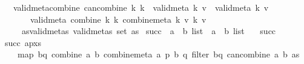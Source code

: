 \begin{isabellebody}
\ \ \ valid{\isacharunderscore}{\kern0pt}meta{\isacharunderscore}{\kern0pt}combine{\isacharcolon}{\kern0pt}\ {\isachardoublequoteopen}can{\isacharunderscore}{\kern0pt}combine\ k{}\ k{}\ {\isasymLongrightarrow}\ valid{\isacharunderscore}{\kern0pt}meta\ k{}\ v{}\ {\isasymLongrightarrow}\ valid{\isacharunderscore}{\kern0pt}meta\ k{}\ v{}\isanewline
\ \ \ \ \ \ {\isasymLongrightarrow}\ valid{\isacharunderscore}{\kern0pt}meta\ {\isacharparenleft}{\kern0pt}combine\ k{}\ k{}{\isacharparenright}{\kern0pt}\ {\isacharparenleft}{\kern0pt}combine{\isacharunderscore}{\kern0pt}meta\ k{}\ v{}\ k{}\ v{}{\isacharparenright}{\kern0pt}{\isachardoublequoteclose}\isanewline
\ \ \ \ \ as{\isacharunderscore}{\kern0pt}valid{\isacharunderscore}{\kern0pt}metas{\isacharcolon}{\kern0pt}\ {\isachardoublequoteopen}valid{\isacharunderscore}{\kern0pt}metas\ {\isacharparenleft}{\kern0pt}set\ as{\isacharparenright}{\kern0pt}{\isachardoublequoteclose}\isanewline
{}\isanewline
\isanewline
{}\isamarkupfalse%
\ succ\ {\isacharcolon}{\kern0pt}{\isacharcolon}{\kern0pt}\ {\isachardoublequoteopen}{\isacharparenleft}{\kern0pt}{\isacharparenleft}{\kern0pt}{\isacharprime}{\kern0pt}a\ {\isacharasterisk}{\kern0pt}\ {\isacharprime}{\kern0pt}b{\isacharparenright}{\kern0pt}\ list\ {\isasymRightarrow}\ {\isacharparenleft}{\kern0pt}{\isacharprime}{\kern0pt}a\ {\isacharasterisk}{\kern0pt}\ {\isacharprime}{\kern0pt}b{\isacharparenright}{\kern0pt}\ list{\isacharparenright}{\kern0pt}{\isachardoublequoteclose}\ \isanewline
\ \ {\isachardoublequoteopen}succ\ {\isacharbrackleft}{\kern0pt}{\isacharbrackright}{\kern0pt}\ {\isacharequal}{\kern0pt}\ {\isacharbrackleft}{\kern0pt}{\isacharbrackright}{\kern0pt}{\isachardoublequoteclose}\isanewline
{\isacharbar}{\kern0pt}\ {\isachardoublequoteopen}succ\ {\isacharparenleft}{\kern0pt}{\isacharparenleft}{\kern0pt}a{\isacharcomma}{\kern0pt}p{\isacharparenright}{\kern0pt}{\isacharhash}{\kern0pt}xs{\isacharparenright}{\kern0pt}\ {\isacharequal}{\kern0pt}\isanewline
\ \ \ \ map\ {\isacharparenleft}{\kern0pt}{\isasymlambda}{\isacharparenleft}{\kern0pt}b{\isacharcomma}{\kern0pt}q{\isacharparenright}{\kern0pt}{\isachardot}{\kern0pt}\ {\isacharparenleft}{\kern0pt}combine\ a\ b{\isacharcomma}{\kern0pt}\ combine{\isacharunderscore}{\kern0pt}meta\ a\ p\ b\ q{\isacharparenright}{\kern0pt}{\isacharparenright}{\kern0pt}\ {\isacharparenleft}{\kern0pt}filter\ {\isacharparenleft}{\kern0pt}{\isasymlambda}{\isacharparenleft}{\kern0pt}b{\isacharcomma}{\kern0pt}q{\isacharparenright}{\kern0pt}{\isachardot}{\kern0pt}\ can{\isacharunderscore}{\kern0pt}combine\ a\ b{\isacharparenright}{\kern0pt}\ as{\isacharparenright}{\kern0pt}\isanewline

\end{isabellebody}
